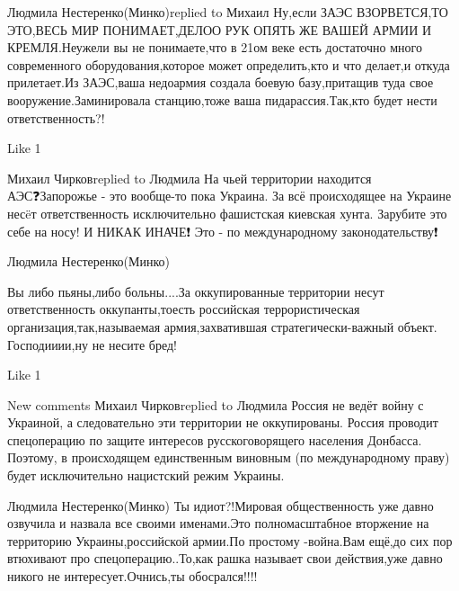 Людмила Нестеренко(Минко)replied to Михаил
Ну,если ЗАЭС ВЗОРВЕТСЯ,ТО ЭТО,ВЕСЬ МИР ПОНИМАЕТ,ДЕЛОО РУК ОПЯТЬ ЖЕ ВАШЕЙ АРМИИ И КРЕМЛЯ.Неужели вы не понимаете,что в 21ом веке есть достаточно много современного оборудования,которое может определить,кто и что делает,и откуда прилетает.Из ЗАЭС,ваша недоармия создала боевую базу,притащив туда свое вооружение.Заминировала станцию,тоже ваша пидарассия.Так,кто будет нести ответственность?!

    Like 1

Михаил Чирковreplied to Людмила
На чьей территории находится АЭС❓Запорожье - это вообще-то пока Украина. 
За всё происходящее на Украине несëт ответственность исключительно фашистская киевская хунта. Зарубите это себе на носу! И НИКАК ИНАЧЕ❗️
Это - по международному законодательству❗

Людмила Нестеренко(Минко)

Вы либо пьяны,либо больны....За оккупированные территории несут ответственность
оккупанты,тоесть российская террористическая организация,так,называемая
армия,захватившая стратегически-важный объект.  Господииии,ну не несите бред!

    Like 1

New comments
Михаил Чирковreplied to Людмила
Россия не ведёт войну с Украиной, а следовательно эти территории не оккупированы.
Россия проводит спецоперацию по защите интересов русскоговорящего населения Донбасса.
Поэтому, в происходящем единственным виновным (по международному праву) будет исключительно нацистский режим Украины.

Людмила Нестеренко(Минко)
Ты идиот?!Мировая общественность уже давно озвучила и назвала все своими именами.Это полномасштабное вторжение на территорию Украины,российской армии.По простому -война.Вам ещё,до сих пор втюхивают про спецоперацию..То,как рашка называет свои действия,уже давно никого не интересует.Очнись,ты обосрался!!!!
